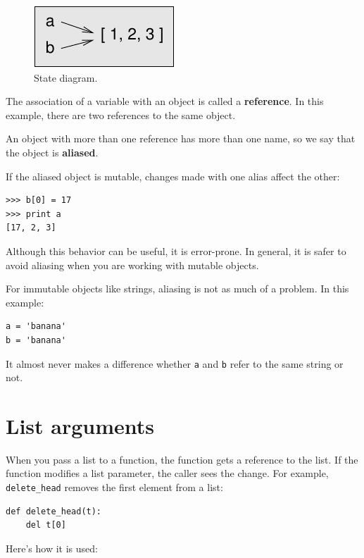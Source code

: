 \documentclass[10pt]{book}
\begin{document}
\begin{figure}
\centerline
{\includegraphics[scale=0.8]{figs/list3.pdf}}
\caption{State diagram.}
\label{fig.list3}
\end{figure}

The association of a variable with an object is called a {\bf
reference}.  In this example, there are two references to the same
object.

An object with more than one reference has more
than one name, so we say that the object is {\bf aliased}.

If the aliased object is mutable, changes made with one alias affect
the other:

\begin{verbatim}
>>> b[0] = 17
>>> print a
[17, 2, 3]
\end{verbatim}
%
Although this behavior can be useful, it is error-prone.  In general,
it is safer to avoid aliasing when you are working with mutable
objects.

For immutable objects like strings, aliasing is not as much of a
problem.  In this example:

\begin{verbatim}
a = 'banana'
b = 'banana'
\end{verbatim}
%
It almost never makes a difference whether {\tt a} and {\tt b} refer
to the same string or not.


\section{List arguments}
\label{list.arguments}

When you pass a list to a function, the function gets a reference
to the list.
If the function modifies a list parameter, the caller sees the change.
For example, \verb"delete_head" removes the first element from a list:

\begin{verbatim}
def delete_head(t):
    del t[0]
\end{verbatim}
%
Here's how it is used:
\end{document}
